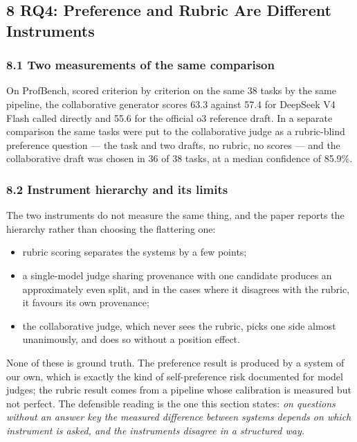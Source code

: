 \documentclass[
]{article}
\providecommand{\tightlist}{%
  \setlength{\itemsep}{0pt}\setlength{\parskip}{0pt}}
\begin{document}
\subsection{8 RQ4: Preference and Rubric Are Different Instruments}\label{rq4}

\subsubsection{8.1 Two measurements of the same comparison}\label{two-measurements}

On ProfBench, scored criterion by criterion on the same 38 tasks by the same pipeline,
the collaborative generator scores 63.3 against 57.4 for DeepSeek V4 Flash called
directly and 55.6 for the official o3 reference draft. In a separate comparison the
same tasks were put to the collaborative judge as a rubric-blind preference question
--- the task and two drafts, no rubric, no scores --- and the collaborative draft was
chosen in 36 of 38 tasks, at a median confidence of 85.9\%.

\subsubsection{8.2 Instrument hierarchy and its limits}\label{instrument-limits}

The two instruments do not measure the same thing, and the paper reports the hierarchy
rather than choosing the flattering one:

\begin{itemize}
\tightlist
\item
  rubric scoring separates the systems by a few points;
\item
  a single-model judge sharing provenance with one candidate produces an approximately
  even split, and in the cases where it disagrees with the rubric, it favours its own
  provenance;
\item
  the collaborative judge, which never sees the rubric, picks one side almost
  unanimously, and does so without a position effect.
\end{itemize}

None of these is ground truth. The preference result is produced by a system of our
own, which is exactly the kind of self-preference risk documented for model judges; the
rubric result comes from a pipeline whose calibration is measured but not perfect. The
defensible reading is the one this section states: \emph{on questions without an answer
key the measured difference between systems depends on which instrument is asked, and
the instruments disagree in a structured way.}
\end{document}
